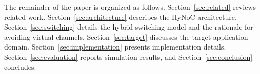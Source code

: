 The remainder of the paper is organized as follows.
Section~\ref{sec:related} reviews related work.
Section~\ref{sec:architecture} describes the HyNoC architecture.
Section~\ref{sec:switching} details the hybrid switching model and the rationale
for avoiding virtual channels.
Section~\ref{sec:target} discusses the target application domain.
Section~\ref{sec:implementation} presents implementation details.
Section~\ref{sec:evaluation} reports simulation results, and
Section~\ref{sec:conclusion} concludes.
